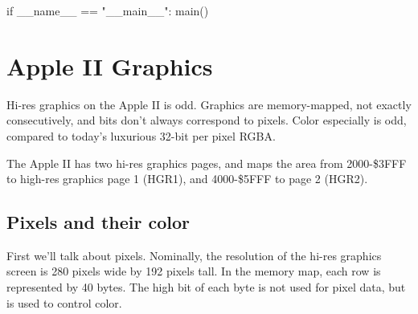 \documentclass[10pt]{report}
\begin{document}
if __name__ == "__main__":
    main()
\nwendcode{}\nwdocspar


\chapter{Apple II Graphics}
Hi-res graphics on the Apple II is odd. Graphics are memory-mapped, not exactly
consecutively, and bits don't always correspond to pixels. Color especially is
odd, compared to today's luxurious 32-bit per pixel RGBA.

The Apple II has two hi-res graphics pages, and maps the area from {\Tt{}{\$}2000-{\$}3FFF\nwendquote} to
high-res graphics page 1 (HGR1), and {\Tt{}{\$}4000-{\$}5FFF\nwendquote} to page 2 (HGR2).

\section{Pixels and their color}
First we'll talk about pixels. Nominally, the resolution of the hi-res graphics screen
is 280 pixels wide by 192 pixels tall. In the memory map, each row is represented
by 40 bytes. The high bit of each byte is not used for pixel data, but is used to
control color.
\end{document}
